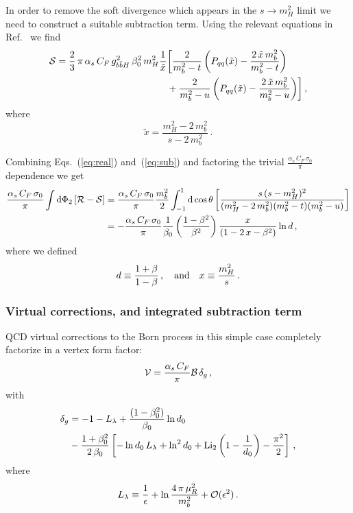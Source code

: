 In order to remove the soft divergence which appears in the  $s\rightarrow
m_H^2$ limit we need to construct a suitable  subtraction term. Using
the relevant 
equations in Ref.~\cite{Krauss:2017wmx} we find
\begin{align}
  \label{eq:sub}
  {\cal S} =
  \frac{2}{3}\,\pi \,\alpha_s\,C_F\,g_{b\bar{b}H}^2\,\beta_0^2\,m_H^2
  \frac{1}{\tilde{x}}&
  \biggl[\frac{2}{m_b^2-t}\left( P_{qq}(\tilde{x})-\frac{2\,\tilde{x}\,m_b^2}{m_b^2-t} \right) \nonumber \\
    &+\frac{2}{m_b^2-u}\left( P_{qq}(\tilde{x})-\frac{2\,\tilde{x}\,m_b^2}{m_b^2-u} \right)\biggr]\,,
\end{align}
where
\begin{equation}
  \tilde{x} = \frac{m_H^2-2\,m_b^2}{s-2\,m_b^2}\,.
\end{equation}

Combining Eqs.~(\ref{eq:real}) and~(\ref{eq:sub}) and factoring
the trivial $\frac{\alpha_s\,C_F\,\sigma_0}{\pi}$ dependence we get
\begin{equation}
  \begin{split}
    \frac{\alpha_s\,C_F\,\sigma_0}{\pi}
    \int{\rm d}\Phi_2 \left[{\cal R} -{\cal S}\right] & =
    \frac{\alpha_s\,C_F\,\sigma_0}{\pi}\frac{m_b^2}{2}
    \int_{-1}^1{\rm d}\cos\theta
    \left[\frac{s\,(s-m_H^2)^2}{(m_H^2-2\,m_b^2)(m_b^2-t)(m_b^2-u)}
    \right]\\
    & = -\frac{\alpha_s\,C_F\,\sigma_0}{\pi}
    \frac{1}{\beta_0}\left(\frac{ 1-\beta^2 }{\beta^2}\right)
    \frac{x}{\left( 1 - 2\,x - \beta^2\right)}\ln d\,,
  \end{split}
\end{equation}
where we defined
\begin{equation}
  d \equiv \frac{1+\beta}{1-\beta}\,,
  \quad {\rm and}\quad x\equiv \frac{m_H^2}{s}\,.
\end{equation}

\subsubsection{Virtual corrections, and integrated subtraction term}
QCD virtual corrections to the Born process in this simple case
completely factorize in a vertex form factor:
\begin{equation}
  {\cal V} = \frac{\alpha_s\,C_F}{\pi}{\cal B}\,\delta_g\,,
\end{equation}
with
\begin{align}
  \delta_g &= -1 - L_{\lambda} +
  \frac{(1-\beta_0^2)}{\beta_0} \ln d_0 \nonumber\\
  &- \frac{1+\beta_0^2}{2\,\beta_0}\left[-\ln d_0\,L_{\lambda} + \ln^2d_0+{\rm Li}_2\left(
      1-\frac{1}{d_0} \right) -\frac{\pi^2}{2} \right]\,,
\end{align}
where
\begin{equation}
  L_{\lambda} \equiv \frac{1}{\epsilon} + \ln\frac{4\,\pi\,\mu_R^2}{m_b^2}
  +{\cal O}(\epsilon^2)\,.
\end{equation}

